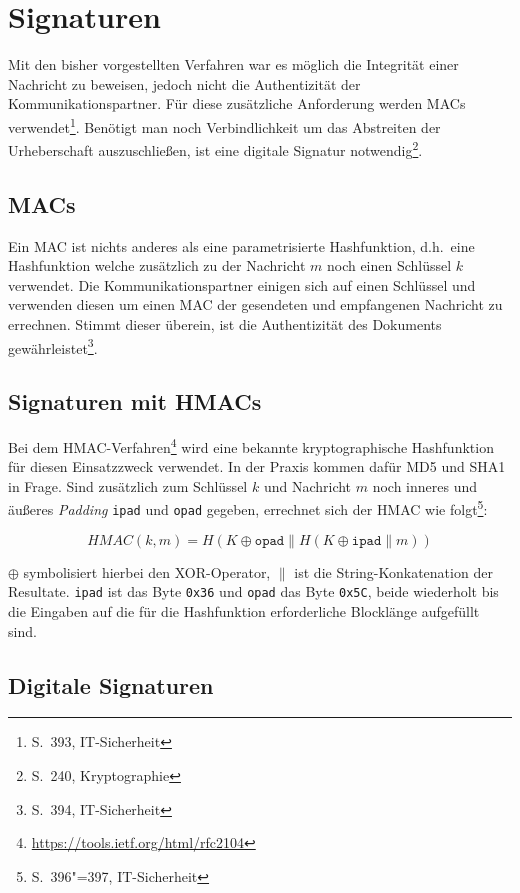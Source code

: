 \author{Autor: Vasilij Schneidermann}
\chapter{Signaturen}

Mit den bisher vorgestellten Verfahren war es möglich die Integrität
einer Nachricht zu beweisen, jedoch nicht die Authentizität der
Kommunikationspartner.  Für diese zusätzliche Anforderung werden
\ac{MAC}s verwendet\footnote{S.~393, IT-Sicherheit}.  Benötigt man
noch Verbindlichkeit um das Abstreiten der Urheberschaft
auszuschließen, ist eine digitale Signatur notwendig\footnote{S.~240,
  Kryptographie}.

\section{\ac{MAC}s}

Ein \ac{MAC} ist nichts anderes als eine parametrisierte Hashfunktion,
d.h.~eine Hashfunktion welche zusätzlich zu der Nachricht $m$ noch
einen Schlüssel $k$ verwendet.  Die Kommunikationspartner einigen sich
auf einen Schlüssel und verwenden diesen um einen \ac{MAC} der
gesendeten und empfangenen Nachricht zu errechnen.  Stimmt dieser
überein, ist die Authentizität des Dokuments
gewährleistet\footnote{S.~394, IT-Sicherheit}.

\section{Signaturen mit \ac{HMAC}s}

Bei dem
\ac{HMAC}-Verfahren\footnote{\url{https://tools.ietf.org/html/rfc2104}}
wird eine bekannte kryptographische Hashfunktion für diesen
Einsatzzweck verwendet.  In der Praxis kommen dafür MD5 und SHA1 in
Frage.  Sind zusätzlich zum Schlüssel $k$ und Nachricht $m$ noch
inneres und äußeres \emph{Padding} \texttt{ipad} und \texttt{opad}
gegeben, errechnet sich der \ac{HMAC} wie folgt\footnote{S.~396"=397,
  IT-Sicherheit}:

$$HMAC(k, m) = H(K \oplus \texttt{opad} \parallel H(K \oplus \texttt{ipad} \parallel m))$$

$\oplus$ symbolisiert hierbei den XOR-Operator, $\parallel$ ist die
String-Konkatenation der Resultate.  \texttt{ipad} ist das Byte
\texttt{0x36} und \texttt{opad} das Byte \texttt{0x5C}, beide
wiederholt bis die Eingaben auf die für die Hashfunktion erforderliche
Blocklänge aufgefüllt sind.

\section{Digitale Signaturen}

